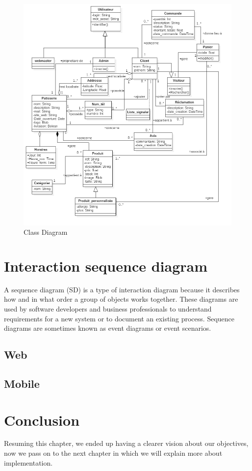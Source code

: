 \documentclass[12pt,a4paper]{report}
\begin{document}
	\clearpage
	\begin{figure}[H]
		\centering
		\includegraphics[width=6.8in,keepaspectratio]{class.png}
		\caption{Class Diagram}
	\end{figure}
	
	\clearpage
	\section{Interaction sequence diagram}
	A sequence diagram (SD) is a type of interaction diagram because it describes how and in what order a group of objects works together. These diagrams are used by software developers and business professionals to understand requirements for a new system or to document an existing process. Sequence diagrams are sometimes known as event diagrams or event scenarios.
	\subsection{Web}
	\subsection{Mobile}
	
	\section*{Conclusion}
	Resuming this chapter, we ended up having a clearer vision about our objectives, now we pass on to the next chapter in which we will explain more about implementation.
	
\end{document}
